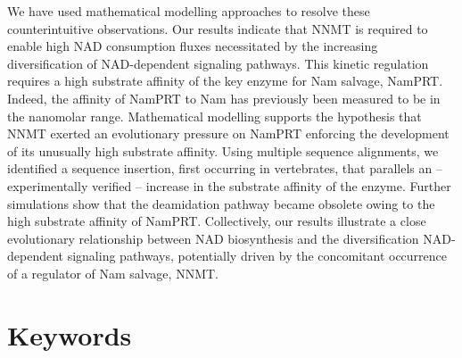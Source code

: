 \documentclass[paper=a4, 12pt]{scrartcl}
\begin{document}
We have used mathematical modelling approaches to resolve these counterintuitive observations. Our results indicate that NNMT is required to enable high NAD consumption fluxes necessitated by the increasing diversification of NAD-dependent signaling pathways. This kinetic regulation requires a high substrate affinity of the key enzyme for Nam salvage, NamPRT. Indeed, the affinity of NamPRT to Nam has previously been measured to be in the nanomolar range. Mathematical modelling supports the hypothesis that NNMT exerted an evolutionary pressure on NamPRT enforcing the development of its unusually high substrate affinity. Using multiple sequence alignments, we identified a sequence insertion, first occurring in vertebrates, that parallels an – experimentally verified – increase in the substrate affinity of the enzyme. Further simulations show that the deamidation pathway became obsolete owing to the high substrate affinity of NamPRT. Collectively, our results illustrate a close evolutionary relationship between NAD biosynthesis and the diversification NAD-dependent signaling pathways, potentially driven by the concomitant occurrence of a regulator of Nam salvage, NNMT.


\section{Keywords}














\end{document}
